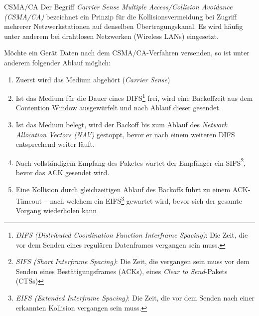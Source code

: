\begin{defi}{CSMA/CA}
    Der Begriff \emph{Carrier Sense Multiple Access/Collision Avoidance (CSMA/CA)} bezeichnet ein Prinzip für die Kollisionsvermeidung bei Zugriff mehrerer Netzwerkstationen auf denselben Übertragungskanal. Es wird häufig unter anderem bei drahtlosen Netzwerken (Wireless LANs) eingesetzt.

    Möchte ein Gerät Daten nach dem CSMA/CA-Verfahren versenden, so ist unter anderem folgender Ablauf möglich:
    \begin{enumerate}
        \item Zuerst wird das Medium abgehört (\emph{Carrier Sense})
        \item Ist das Medium für die Dauer eines DIFS\footnote{\emph{DIFS (Distributed Coordination Function Interframe Spacing)}: Die Zeit, die vor dem Senden eines regulären Datenframes vergangen sein muss.} frei, wird eine Backoffzeit aus dem Contention Window ausgewürfelt und nach Ablauf dieser gesendet.
        \item Ist das Medium belegt, wird der Backoff bis zum Ablauf des \emph{Network Allocation Vectors (NAV)} gestoppt, bevor er nach einem weiteren DIFS entsprechend weiter läuft.
        \item Nach vollständigem Empfang des Paketes wartet der Empfänger ein SIFS\footnote{\emph{SIFS (Short Interframe Spacing)}: Die Zeit, die vergangen sein muss vor dem Senden eines Bestätigungsframes (ACKs), eines \emph{Clear to Send}-Pakets (CTSs)}, bevor das ACK gesendet wird.
        \item Eine Kollision durch gleichzeitigen Ablauf des Backoffs führt zu einem ACK-Timeout – nach welchem ein EIFS\footnote{\emph{EIFS (Extended Interframe Spacing)}: Die Zeit, die vor dem Senden nach einer erkannten Kollision vergangen sein muss.} gewartet wird, bevor sich der gesamte Vorgang wiederholen kann
    \end{enumerate}
\end{defi}